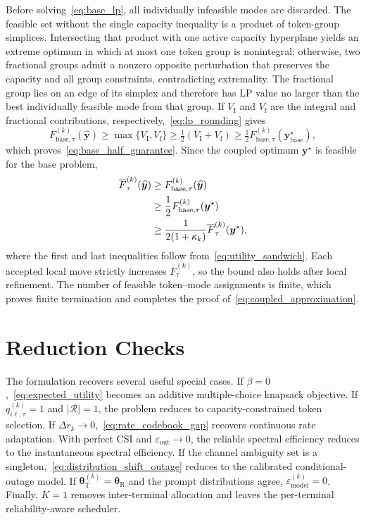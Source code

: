 \documentclass[journal]{IEEEtran}
\begin{document}
Before solving~\eqref{eq:base_lp}, all individually infeasible modes are discarded. The feasible set without the single capacity inequality is a product of token-group simplices. Intersecting that product with one active capacity hyperplane yields an extreme optimum in which at most one token group is nonintegral; otherwise, two fractional groups admit a nonzero opposite perturbation that preserves the capacity and all group constraints, contradicting extremality. The fractional group lies on an edge of its simplex and therefore has LP value no larger than the best individually feasible mode from that group. If $V_{\mathrm I}$ and $V_{\mathrm f}$ are the integral and fractional contributions, respectively,~\eqref{eq:lp_rounding} gives
\begin{equation}
F_{\mathrm{base},\tau}^{(k)}(\widehat{\bm y})
\geq\max\{V_{\mathrm I},V_{\mathrm f}\}
\geq\tfrac12(V_{\mathrm I}+V_{\mathrm f})
\geq\tfrac12F_{\mathrm{base},\tau}^{(k)}(\bm y_{\mathrm{base}}^{\star}),
\end{equation}
which proves~\eqref{eq:base_half_guarantee}. Since the coupled optimum $\bm y^{\star}$ is feasible for the base problem,
\begin{align}
\overline F_{\tau}^{(k)}(\widehat{\bm y})
&\geq F_{\mathrm{base},\tau}^{(k)}(\widehat{\bm y})
\notag\\
&\geq\frac12F_{\mathrm{base},\tau}^{(k)}(\bm y^{\star})
\notag\\
&\geq\frac{1}{2(1+\kappa_k)}
\overline F_{\tau}^{(k)}(\bm y^{\star}),
\end{align}
where the first and last inequalities follow from~\eqref{eq:utility_sandwich}. Each accepted local move strictly increases $\overline F_{\tau}^{(k)}$, so the bound also holds after local refinement. The number of feasible token--mode assignments is finite, which proves finite termination and completes the proof of~\eqref{eq:coupled_approximation}.

\section{Reduction Checks}

The formulation recovers several useful special cases. If $\beta=0$,~\eqref{eq:expected_utility} becomes an additive multiple-choice knapsack objective. If $q_{i\ell,\tau}^{(k)}=1$ and $|\mathcal R|=1$, the problem reduces to capacity-constrained token selection. If $\Delta r_k\rightarrow0$,~\eqref{eq:rate_codebook_gap} recovers continuous rate adaptation. With perfect CSI and $\varepsilon_{\mathrm{out}}\rightarrow0$, the reliable spectral efficiency reduces to the instantaneous spectral efficiency. If the channel ambiguity set is a singleton,~\eqref{eq:distribution_shift_outage} reduces to the calibrated conditional-outage model. If $\bm\theta_{\mathrm T}^{(k)}=\bm\theta_{\mathrm R}$ and the prompt distributions agree, $\varepsilon_{\mathrm{model}}^{(k)}=0$. Finally, $K=1$ removes inter-terminal allocation and leaves the per-terminal reliability-aware scheduler.



\end{document}
